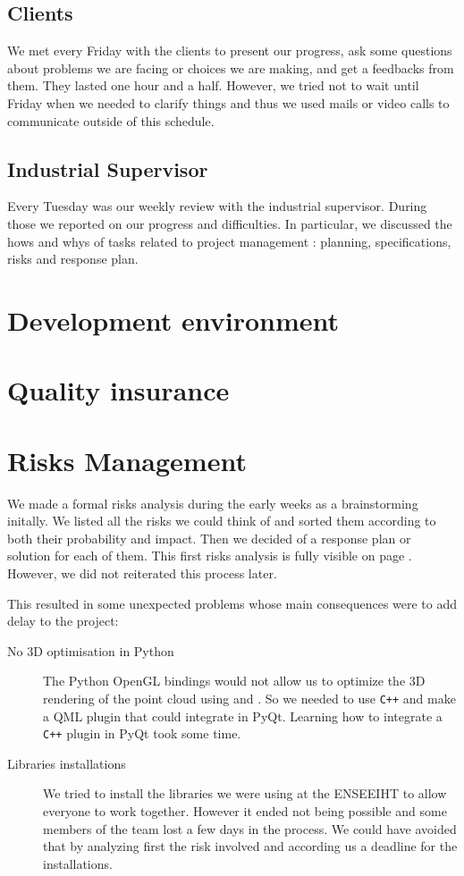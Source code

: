 \subsection{Clients}
We met every Friday with the clients to present our progress, ask some
questions about problems we are facing or choices we are making, and
get a feedbacks from them. They lasted one hour and a half. However,
we tried not to wait until Friday when we needed to clarify things and
thus we used mails or video calls to communicate outside of this
schedule.

\subsection{Industrial Supervisor}
Every Tuesday was our weekly review with the industrial
supervisor. During those we reported on our progress and
difficulties. In particular, we discussed the hows and whys of tasks
related to project management : planning, specifications, risks and
response plan.

\section{Development environment}
\section{Quality insurance}

\section{Risks Management}
We made a formal risks analysis during the early weeks as a
brainstorming initally. We listed all the risks we could think of and
sorted them according to both their probability and impact. Then we
decided of a response plan or solution for each of them. This first
risks analysis is fully visible on page \pageref{fig:risks}. However,
we did not reiterated this process later. 

This resulted in some unexpected problems whose main consequences were
to add delay to the project:

\begin{description}
\item[No 3D optimisation in Python] The Python OpenGL bindings would
  not allow us to optimize the 3D rendering of the point cloud using
   and . So we needed
  to use \verb!C++! and make a QML plugin that could integrate in
  PyQt. Learning how to integrate a \verb!C++! plugin in PyQt took some time.
\item[Libraries installations] We tried to install the libraries we
  were using at the ENSEEIHT to allow everyone to work
  together. However it ended not being possible and some members of
  the team lost a few days in the process. We could have avoided that
  by analyzing first the risk involved and according us a deadline for
  the installations.
\end{description}

